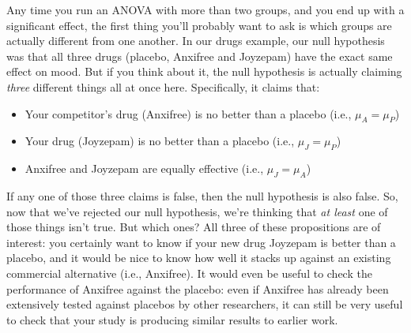 
Any time you run an ANOVA with more than two groups, and you end up with a significant effect, the first thing you'll probably want to ask is which groups are actually different from one another. In our drugs example, our null hypothesis was that all three drugs (placebo, Anxifree and Joyzepam) have the exact same effect on mood. But if you think about it, the null hypothesis is actually claiming {\it three} different things all at once here. Specifically, it claims that:
\begin{itemize} \itemsep 0pt
\item Your competitor's drug (Anxifree) is no better than a placebo (i.e., $\mu_A = \mu_P$)
\item Your drug (Joyzepam) is no better than a placebo (i.e., $\mu_J = \mu_P$)
\item Anxifree and Joyzepam are equally effective (i.e., $\mu_J = \mu_A$)
\end{itemize}
If any one of those three claims is false, then the null hypothesis is also false. So, now that we've rejected our null hypothesis, we're thinking that {\it at least} one of those things isn't true. But which ones? All three of these propositions are of interest: you certainly want to know if your new drug Joyzepam is better than a placebo, and it would be nice to know how well it stacks up against an existing commercial alternative (i.e., Anxifree). It would even be useful to check the performance of Anxifree against the placebo: even if Anxifree has already been extensively tested against placebos by other researchers, it can still be very useful to check that your study is producing similar results to earlier work.

